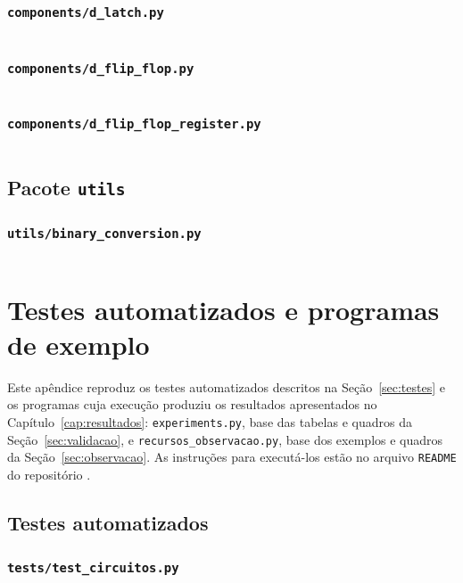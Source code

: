 \subsection*{\texttt{components/d\_latch.py}}
\inputminted{python}{../components/d_latch.py}

\subsection*{\texttt{components/d\_flip\_flop.py}}
\inputminted{python}{../components/d_flip_flop.py}

\subsection*{\texttt{components/d\_flip\_flop\_register.py}}
\inputminted{python}{../components/d_flip_flop_register.py}

\section{Pacote \texttt{utils}}

\subsection*{\texttt{utils/binary\_conversion.py}}
\inputminted{python}{../utils/binary_conversion.py}

\chapter{Testes automatizados e programas de exemplo}
\label{ap:testes-exemplos}

Este apêndice reproduz os testes automatizados descritos na Seção~\ref{sec:testes} e os programas cuja execução produziu os resultados apresentados no Capítulo~\ref{cap:resultados}: \texttt{experiments.py}, base das tabelas e quadros da Seção~\ref{sec:validacao}, e \texttt{recursos\_observacao.py}, base dos exemplos e quadros da Seção~\ref{sec:observacao}. As instruções para executá-los estão no arquivo \texttt{README} do repositório \cite{esteche2026}.

\section{Testes automatizados}

\subsection*{\texttt{tests/test\_circuitos.py}}
\inputminted{python}{../tests/test_circuitos.py}

